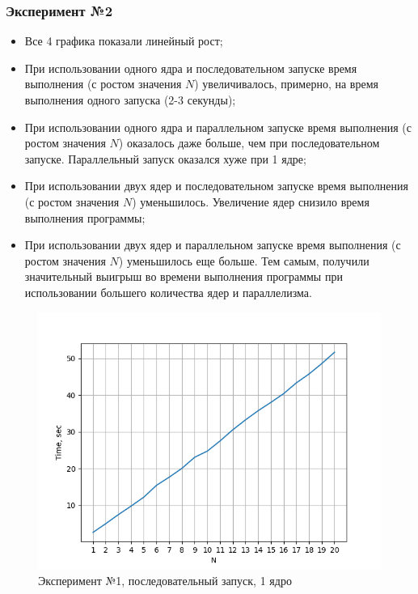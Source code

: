 \documentclass{article}
\begin{document}
\subsubsection*{Эксперимент №2}
\begin{itemize}
    \item Все 4 графика показали линейный рост;
    \item При использовании одного ядра и последовательном запуске время выполнения (с ростом значения $N$) увеличивалось, примерно, на время выполнения одного запуска (2-3 секунды);
    \item При использовании одного ядра и параллельном запуске время выполнения (с ростом значения $N$) оказалось даже больше, чем при последовательном запуске. Параллельный запуск оказался хуже при 1 ядре;
    \item При использовании двух ядер и последовательном запуске время выполнения (с ростом значения $N$) уменьшилось. Увеличение ядер снизило время выполнения программы;
    \item При использовании двух ядер и параллельном запуске время выполнения (с ростом значения $N$) уменьшилось еще больше. Тем самым, получили значительный выигрыш во времени выполнения программы при использовании большего количества ядер и параллелизма.
\end{itemize}

\newpage

\begin{figure}
    \centering
    \includegraphics[scale=0.7]{Graphic-1.png}
    \caption{Эксперимент №1, последовательный запуск, 1 ядро}
    \label{fig:enter-label}
\end{figure}
\end{document}

